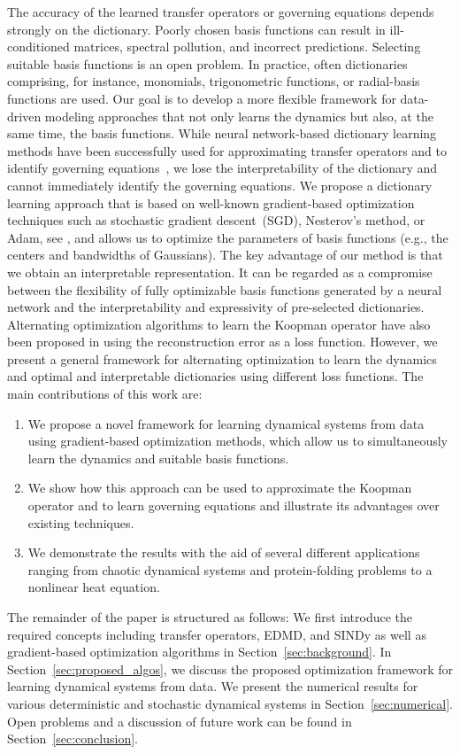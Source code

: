 \documentclass
[
    a4paper,
    DIV=11,
    abstract=true,
    11pt,
]
{scrartcl}
\theoremstyle{definition}
\begin{document}
The accuracy of the learned transfer operators or governing equations depends strongly on the dictionary. Poorly chosen basis functions can result in ill-conditioned matrices, spectral pollution, and incorrect predictions. Selecting suitable basis functions is an open problem. In practice, often dictionaries comprising, for instance, monomials, trigonometric functions, or radial-basis functions are used. Our goal is to develop a more flexible framework for data-driven modeling approaches that not only learns the dynamics but also, at the same time, the basis functions. While neural network-based dictionary learning methods have been successfully used for approximating transfer operators and to identify governing equations~\cite{mardt2018vampnets, gulina2021two, li2017extended, jin2024extended}, we lose the interpretability of the dictionary and cannot immediately identify the governing equations. We propose a dictionary learning approach that is based on well-known gradient-based optimization techniques such as stochastic gradient descent~(SGD), Nesterov's method, or Adam, see \cite{kingma2014adam, lu2022gradient, nesterov2018lectures}, and allows us to optimize the parameters of basis functions (e.g., the centers and bandwidths of Gaussians). The key advantage of our method is that we obtain an interpretable representation. It can be regarded as a compromise between the flexibility of fully optimizable basis functions generated by a neural network and the interpretability and expressivity of pre-selected dictionaries. Alternating optimization algorithms to learn the Koopman operator have also been proposed in \cite{liu2020towards, gulina2021two} using the reconstruction error as a loss function. However, we present a general framework for alternating optimization to learn the dynamics and optimal and interpretable dictionaries using different loss functions. The main contributions of this work are:
\begin{enumerate}
\item We propose a novel framework for learning dynamical systems from data using gradient-based optimization methods, which allow us to simultaneously learn the dynamics and suitable basis functions.
\item We show how this approach can be used to approximate the Koopman operator and to learn governing equations and illustrate its advantages over existing techniques.
\item We demonstrate the results with the aid of several different applications ranging from chaotic dynamical systems and protein-folding problems to a nonlinear heat equation.
\end{enumerate}
The remainder of the paper is structured as follows: We first introduce the required concepts including transfer operators, EDMD, and SINDy as well as gradient-based optimization algorithms in Section~\ref{sec:background}. In Section~\ref{sec:proposed_algos}, we discuss the proposed optimization framework for learning dynamical systems from data. We present the numerical results for various deterministic and stochastic dynamical systems in Section~\ref{sec:numerical}. Open problems and a discussion of future work can be found in Section~\ref{sec:conclusion}.
\end{document}

